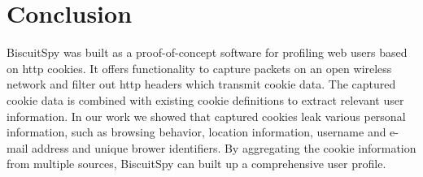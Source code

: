 \section{Conclusion}
\label{sec:conclusion}

BiscuitSpy was built as a proof-of-concept software for profiling web users based on http cookies. It offers functionality to capture packets on an open wireless network and filter out http headers which transmit cookie data. The captured cookie data is combined with existing cookie definitions to extract relevant user information. In our work we showed that captured cookies leak various personal information, such as browsing behavior, location information, username and e-mail address and unique brower identifiers. By aggregating the cookie information from multiple sources, BiscuitSpy can built up a comprehensive user profile.